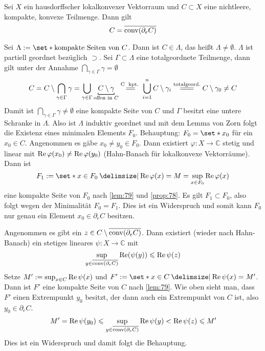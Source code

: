 \begin{satz}[{name={Krein-Milman}}]
	Sei $X$ ein hausdorffscher lokalkonvexer Vektorraum und $C \subset X$ eine nichtleere, kompakte, konvexe Teilmenge.
	Dann gilt 
	\[
		C=\overline{\operatorname{conv}(\partial_e C)}
	\]
\end{satz}
\begin{beweis}
	Sei $\Lambda := \set*{\text{kompakte Seiten von }C}$.
	Dann ist $C \in \Lambda$, das heißt $\Lambda \neq \emptyset$.
	$\Lambda$ ist partiell geordnet bezüglich $\supset$.
	Sei $\Gamma \subset \Lambda$ eine totalgeordnete Teilmenge, dann gilt unter der Annahme $\bigcap_{\gamma \in \Gamma} \gamma =\emptyset$
	\[
		C= C \setminus \bigcap_{\gamma \in \Gamma} \gamma = \bigcup_{\gamma \in \Gamma} \Underbracket{C \setminus \gamma}{\text{offen in }C}\StackText{C \text{ kpt.} }{=\joinrel=} 
		\bigcup_{i=1}^n C \setminus \gamma_i \StackText{totalgeord.}{=\joinrel=\joinrel=} C \setminus \gamma_0 \neq C
	\]
	Damit ist $\bigcap_{\gamma \in \Gamma} \gamma \neq \emptyset$ eine kompakte Seite von $C$ und $\Gamma$ besitzt eine untere Schranke in $\Lambda$.
	Also ist $\Lambda$ induktiv geordnet und mit dem Lemma von Zorn folgt die Existenz eines minimalen Elements $F_0$.
	Behauptung: $F_0= \set*{x_0}$ für ein $x_0 \in C$.
	Angenommen es gäbe $x_0 \neq y_0 \in F_0$. 
	Dann existiert $\varphi \colon X \to \mathbb{C}$ stetig und linear mit $\operatorname{Re} \varphi(x_0) \neq \operatorname{Re} \varphi(y_0)$ (Hahn-Banach für lokalkonvexe Vektorräume).
	Dann ist 
	\[
		F_1 :=  \set*{x \in F_0 \given \re \varphi(x)=M=\sup_{x \in F_0} \re \varphi(x)}
	\]
	eine kompakte Seite von $F_0$ nach \autoref{lem:79} und \autoref{prop:78}.
	Es gilt $F_1 \subset F_0$, also folgt wegen der Minimalität $F_0=F_1$.
	Dies ist ein Widerspruch und somit kann $F_0$ nur genau ein Element $x_0 \in \partial_e C$ besitzen.
	
	Angenommen es gibt ein $z \in C \setminus \overline{\operatorname{conv}(\partial_e C)}$.
	Dann existiert (wieder nach Hahn-Banach) ein stetiges lineares $\psi \colon X \to \mathbb{C}$ mit 
	\[
		\sup_{y \in \overline{\conv(\partial_e C)}} \re \enbrace*{\psi(y)} \le \re \psi(z)
	\]
	Setze $M' := \sup_{x \in C} \operatorname{Re} \psi(x)$ und $F':= \set*{x \in C \given \re \psi(x) =M'}$.
	Dann ist $F'$ eine kompakte Seite von $C$ nach \autoref{lem:79}.
	Wie oben sieht man, dass $F'$ einen Extrempunkt $y_0$ besitzt, der dann auch ein Extrempunkt von $C$ ist, also $y_0 \in \partial_e C$.
	\[
		M' = \operatorname{Re} \psi(y_0) \leqslant \sup_{y \in \overline{\operatorname{conv}(\partial_e C)}} \operatorname{Re} \psi(y) < \operatorname{Re} \psi(z) \leqslant M'
	\]
	Dies ist ein Widerspruch und damit folgt die Behauptung.
\end{beweis}

